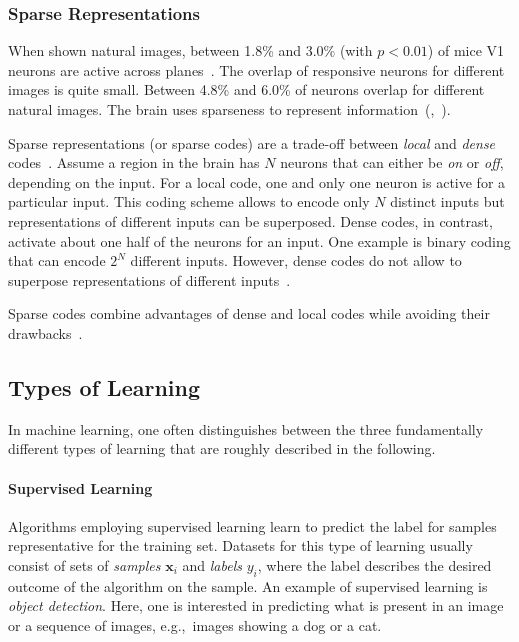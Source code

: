 \subsubsection{Sparse Representations}\label{subsubsec:sparse_representations}

When shown natural images, between 1.8\% and 3.0\% (with $p < 0.01$) of mice \ac{V1} neurons are active across planes~\citep{yoshida2020natural}.
The overlap of responsive neurons for different images is quite small.
Between 4.8\% and 6.0\% of neurons overlap for different natural images.
The brain uses sparseness to represent information~(\citep{yoshida2020natural},~\citep[pp. 356, ff.]{trappenberg2010fundamentals}).

Sparse representations (or sparse codes) are a trade-off between \textit{local} and \textit{dense} codes~\citep{foldiak2003sparse}.
Assume a region in the brain has $N$ neurons that can either be \textit{on} or \textit{off}, depending on the input.
For a local code, one and only one neuron is active for a particular input.
This coding scheme allows to encode only $N$ distinct inputs but representations of different inputs can be superposed.
Dense codes, in contrast, activate about one half of the neurons for an input.
One example is binary coding that can encode $2^N$ different inputs.
However, dense codes do not allow to superpose representations of different inputs~\citep{foldiak2003sparse}.

Sparse codes combine advantages of dense and local codes while avoiding their drawbacks~\citep{foldiak2003sparse}.

\subsection{Types of Learning}\label{subsec:types-of-learning}

In machine learning, one often distinguishes between the three fundamentally different types of learning that are roughly described in the following.

\paragraph{Supervised Learning}
Algorithms employing supervised learning learn to predict the label for samples representative for the training set.
Datasets for this type of learning usually consist of sets of \textit{samples} $\bm{x}_i$ and \textit{labels} $y_i$, where the label describes the desired outcome of the algorithm on the sample.
An example of supervised learning is \textit{object detection}.
Here, one is interested in predicting what is present in an image or a sequence of images, e.g.,~images showing a dog or a cat.

